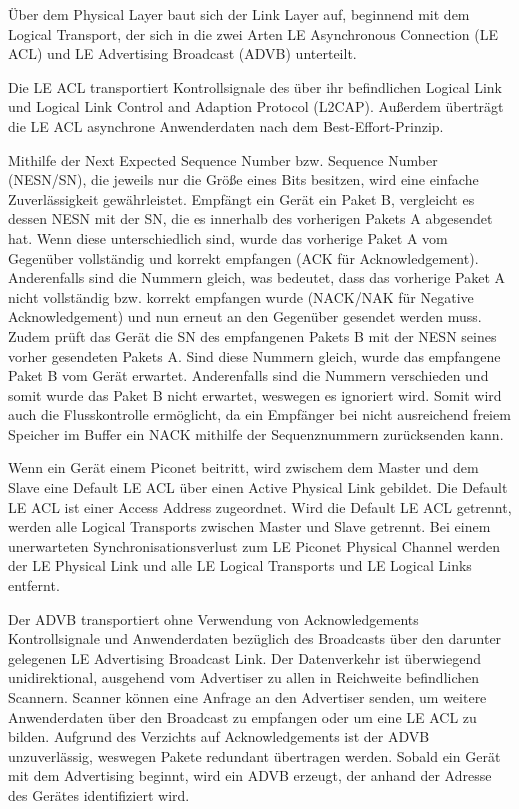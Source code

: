 Über dem Physical Layer baut sich der Link Layer auf, beginnend mit dem Logical Transport, der sich in die zwei Arten LE Asynchronous Connection (LE ACL) und LE Advertising Broadcast (ADVB) unterteilt.

Die LE ACL transportiert Kontrollsignale des über ihr befindlichen Logical Link und Logical Link Control and Adaption Protocol (L2CAP). Außerdem überträgt die LE ACL asynchrone Anwenderdaten nach dem Best-Effort-Prinzip.

Mithilfe der Next Expected Sequence Number bzw. Sequence Number (NESN/SN), die jeweils nur die Größe eines Bits besitzen, wird eine einfache Zuverlässigkeit gewährleistet. Empfängt ein Gerät ein Paket B, vergleicht es dessen NESN mit der SN, die es innerhalb des vorherigen Pakets A abgesendet hat. Wenn diese unterschiedlich sind, wurde das vorherige Paket A vom Gegenüber vollständig und korrekt empfangen (ACK für Acknowledgement). Anderenfalls sind die Nummern gleich, was bedeutet, dass das vorherige Paket A nicht vollständig bzw. korrekt empfangen wurde (NACK/NAK für Negative Acknowledgement) und nun erneut an den Gegenüber gesendet werden muss. Zudem prüft das Gerät die SN des empfangenen Pakets B mit der NESN seines vorher gesendeten Pakets A. Sind diese Nummern gleich, wurde das empfangene Paket B vom Gerät erwartet. Anderenfalls sind die Nummern verschieden und somit wurde das Paket B nicht erwartet, weswegen es ignoriert wird. Somit wird auch die Flusskontrolle ermöglicht, da ein Empfänger bei nicht ausreichend freiem Speicher im Buffer ein NACK mithilfe der Sequenznummern zurücksenden kann. \cite{BtSpec4.0_2239-2241}

Wenn ein Gerät einem Piconet beitritt, wird zwischem dem Master und dem Slave eine Default LE ACL über einen Active Physical Link gebildet. Die Default LE ACL ist einer Access Address zugeordnet. Wird die Default LE ACL getrennt, werden alle Logical Transports zwischen Master und Slave getrennt. Bei einem unerwarteten Synchronisationsverlust zum LE Piconet Physical Channel werden der LE Physical Link und alle LE Logical Transports und LE Logical Links entfernt.

Der ADVB transportiert ohne Verwendung von Acknowledgements Kontrollsignale und Anwenderdaten bezüglich des Broadcasts über den darunter gelegenen LE Advertising Broadcast Link. Der Datenverkehr ist überwiegend unidirektional, ausgehend vom Advertiser zu allen in Reichweite befindlichen Scannern. Scanner können eine Anfrage an den Advertiser senden, um weitere Anwenderdaten über den Broadcast zu empfangen oder um eine LE ACL zu bilden. Aufgrund des Verzichts auf Acknowledgements ist der ADVB unzuverlässig, weswegen Pakete redundant übertragen werden. Sobald ein Gerät mit dem Advertising beginnt, wird ein ADVB erzeugt, der anhand der Adresse des Gerätes identifiziert wird. \cite{BtSpec4.0_174-175}
